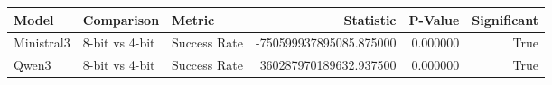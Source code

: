 \begin{tabular}{lllrrr}
\toprule
Model & Comparison & Metric & Statistic & P-Value & Significant \\
\midrule
Ministral3 & 8-bit vs 4-bit & Success Rate & -750599937895085.875000 & 0.000000 & True \\
Qwen3 & 8-bit vs 4-bit & Success Rate & 360287970189632.937500 & 0.000000 & True \\
\bottomrule
\end{tabular}
